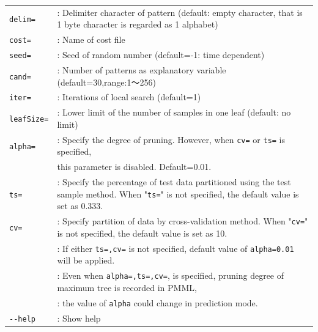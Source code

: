 \begin{table}[htbp]
{\begin{tabular}{ll}
\verb|delim=| & : Delimiter character of pattern (default: empty character, that is 1 byte character is regarded as 1 alphabet)  \\
\verb|cost=|  & : Name of cost file \\
\verb|seed=|  & : Seed of random number (default=-1: time dependent) \\
\verb|cand=|  & : Number of patterns as explanatory variable (default=30,range:1〜256) \\
\verb|iter=|  & : Iterations of local search (default=1) \\
\verb|leafSize=| & : Lower limit of the number of samples in one leaf (default: no limit)  \\
\verb|alpha=|    & : Specify the degree of pruning. However, when \verb|cv=| or \verb|ts=| is specified, \\
		& this parameter is disabled. Default=0.01.  \\
\verb|ts=|       & : Specify the percentage of test data partitioned using the test sample method. When "\verb|ts=|" is not specified, the default value is set as 0.333.  \\
\verb|cv=|       & : Specify partition of data by cross-validation method. When "\verb|cv=|" is not specified, the default value is set as 10.  \\
                 & : If either \verb|ts=,cv=| is not specified, default value of \verb|alpha=0.01| will be applied.  \\
                 & : Even when \verb|alpha=,ts=,cv=|, is specified, pruning degree of maximum tree is recorded in PMML,   \\
                 & : the value of \verb|alpha| could change in prediction mode. \\
\verb|--help|    & : Show help \\

\end{tabular} 
}
\end{table} 

